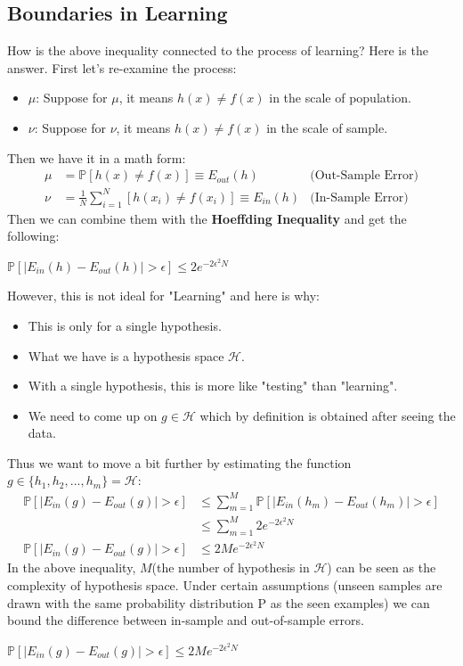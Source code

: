 \documentclass{article}
\begin{document}
\subsection{Boundaries in Learning}
How is the above inequality connected to the process of learning? Here is the answer. First let's re-examine the process:
\begin{itemize}
    \item $\mu$: Suppose for $\mu$, it means $h(x) \neq f(x)$ in the scale of population.
    \item $\nu$: Suppose for $\nu$, it means $h(x) \neq f(x)$ in the scale of sample.
\end{itemize}
Then we have it in a math form: 
\begin{align*}
    \mu &= \mathbb{P}[h(x) \neq f(x)] \equiv E_{out}(h) & \text{(Out-Sample Error)}\\
    \nu &= \frac{1}{N}\sum_{i=1}^{N}[h(x_{i}) \neq f(x_{i})] \equiv E_{in}(h) & \text{(In-Sample Error)}
\end{align*}
Then we can combine them with the \textbf{Hoeffding Inequality} and get the following:
\begin{tcolorbox}[colback=yellow!20, colframe=yellow!90, title=Expanded Hoeffding Inequality 1, coltitle=black]
$\mathbb{P}[\mid E_{in}(h) - E_{out}(h) \mid > \epsilon] \leq 2e^{-2\epsilon^{2}N}$
\end{tcolorbox}
However, this is not ideal for "Learning" and here is why:
\begin{itemize}
    \item This is only for a single hypothesis.
    \item What we have is a hypothesis space $\mathcal{H}$.
    \item With a single hypothesis, this is more like "testing" than "learning".
    \item We need to come up on $g \in \mathcal{H}$ which by definition is obtained after seeing the data.
\end{itemize}
Thus we want to move a bit further by estimating the function $g \in \{ h_{1}, h_{2}, ..., h_{m}\} = \mathcal{H}$:
\begin{align*}
    \mathbb{P}[\mid E_{in}(g) - E_{out}(g) \mid > \epsilon] & \leq \sum_{m=1}^{M} \mathbb{P}[\mid E_{in}(h_{m}) - E_{out}(h_{m}) \mid > \epsilon]\\
    & \leq \sum_{m=1}^{M}2e^{-2\epsilon^{2}N}\\
    \mathbb{P}[\mid E_{in}(g) - E_{out}(g) \mid > \epsilon] & \leq 2Me^{-2\epsilon^{2}N}
\end{align*}
In the above inequality, $M$(the number of hypothesis in $\mathcal{H}$) can be seen as the complexity of hypothesis space. Under certain assumptions (unseen samples are drawn with the same probability distribution P as the seen examples) we can bound the difference between in-sample and out-of-sample errors.
\begin{tcolorbox}[colback=yellow!20, colframe=yellow!90, title=Expanded Hoeffding Inequality 2, coltitle=black]
$\mathbb{P}[\mid E_{in}(g) - E_{out}(g) \mid > \epsilon] \leq 2Me^{-2\epsilon^{2}N}$
\end{tcolorbox}
\end{document}

